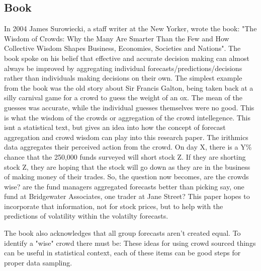\subsection{Book}
In 2004 James Surowiecki, a staff writer at the New Yorker, wrote the book: "The Wisdom of Crowds: Why the Many Are Smarter Than the Few and How Collective Wisdom Shapes Business, Economies, Societies and Nations". The book spoke on his belief that effective and accurate decision making can almost always be improved by aggregating individual forecasts/predictions/decisions rather than individuals making decisions on their own. The simplest example from the book was the old story about Sir Francis Galton, being taken back at a silly carnival game for a crowd to guess the weight of an ox. The mean of the guesses was accurate, while the individual guesses themselves were no good. This is what the wisdom of the crowds or aggregation of the crowd intellegence. This isnt a statistical text, but gives an idea into how the concept of forecast aggregation and crowd wisdom can play into this research paper. The irithmics data aggregates their perceived action from the crowd. On day X, there is a Y\% chance that the 250,000 funds surveyed will short stock Z. If they are shorting stock Z, they are hoping that the stock will go down as they are in the business of making money of their trades. So, the question now becomes, are the crowds wise? are the fund managers aggregated forecasts better than picking say, one fund at Bridgewater Associates, one trader at Jane Street? This paper hopes to incorporate that information, not for stock prices, but to help with the predictions of volatility within the volatilty forecasts.   

The book also acknowledges that all group forecasts aren't created equal. To identify a "wise" crowd there must be: 
\cite{wiki:crowds} 
These ideas for using crowd sourced things can be useful in statistical context, each of these items can be good steps for proper data sampling.   

